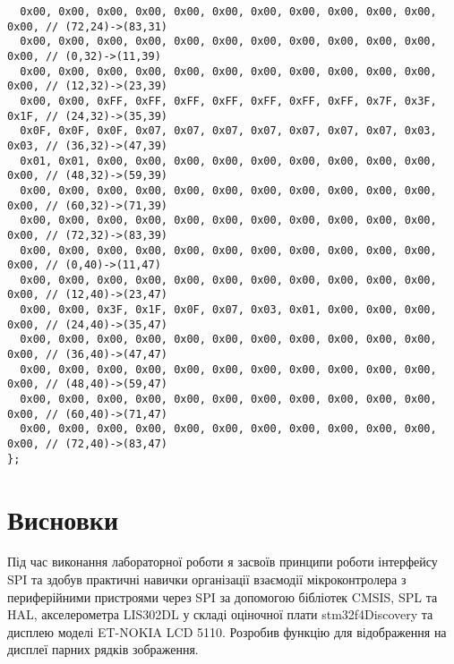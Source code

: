 \documentclass[oneside,14pt]{extarticle}
\begin{document}
\begin{normalsize}
{\begin{lstlisting}
  0x00, 0x00, 0x00, 0x00, 0x00, 0x00, 0x00, 0x00, 0x00, 0x00, 0x00, 0x00, // (72,24)->(83,31)
  0x00, 0x00, 0x00, 0x00, 0x00, 0x00, 0x00, 0x00, 0x00, 0x00, 0x00, 0x00, // (0,32)->(11,39)
  0x00, 0x00, 0x00, 0x00, 0x00, 0x00, 0x00, 0x00, 0x00, 0x00, 0x00, 0x00, // (12,32)->(23,39)
  0x00, 0x00, 0xFF, 0xFF, 0xFF, 0xFF, 0xFF, 0xFF, 0xFF, 0x7F, 0x3F, 0x1F, // (24,32)->(35,39)
  0x0F, 0x0F, 0x0F, 0x07, 0x07, 0x07, 0x07, 0x07, 0x07, 0x07, 0x03, 0x03, // (36,32)->(47,39)
  0x01, 0x01, 0x00, 0x00, 0x00, 0x00, 0x00, 0x00, 0x00, 0x00, 0x00, 0x00, // (48,32)->(59,39)
  0x00, 0x00, 0x00, 0x00, 0x00, 0x00, 0x00, 0x00, 0x00, 0x00, 0x00, 0x00, // (60,32)->(71,39)
  0x00, 0x00, 0x00, 0x00, 0x00, 0x00, 0x00, 0x00, 0x00, 0x00, 0x00, 0x00, // (72,32)->(83,39)
  0x00, 0x00, 0x00, 0x00, 0x00, 0x00, 0x00, 0x00, 0x00, 0x00, 0x00, 0x00, // (0,40)->(11,47)
  0x00, 0x00, 0x00, 0x00, 0x00, 0x00, 0x00, 0x00, 0x00, 0x00, 0x00, 0x00, // (12,40)->(23,47)
  0x00, 0x00, 0x3F, 0x1F, 0x0F, 0x07, 0x03, 0x01, 0x00, 0x00, 0x00, 0x00, // (24,40)->(35,47)
  0x00, 0x00, 0x00, 0x00, 0x00, 0x00, 0x00, 0x00, 0x00, 0x00, 0x00, 0x00, // (36,40)->(47,47)
  0x00, 0x00, 0x00, 0x00, 0x00, 0x00, 0x00, 0x00, 0x00, 0x00, 0x00, 0x00, // (48,40)->(59,47)
  0x00, 0x00, 0x00, 0x00, 0x00, 0x00, 0x00, 0x00, 0x00, 0x00, 0x00, 0x00, // (60,40)->(71,47)
  0x00, 0x00, 0x00, 0x00, 0x00, 0x00, 0x00, 0x00, 0x00, 0x00, 0x00, 0x00, // (72,40)->(83,47)
};
		\end{lstlisting}
	}
	
	\section*{Висновки}
	Під час виконання лабораторної роботи я засвоїв принципи роботи інтерфейсу SPI та здобув практичні навички організації взаємодії мікроконтролера з периферійними пристроями через SPI за допомогою бібліотек CMSIS, SPL та HAL, акселерометра LIS302DL у складі оціночної плати stm32f4Discovery та дисплею моделі ET-NOKIA LCD 5110. Розробив функцію для відображення на дисплеї парних рядків зображення.
	    
\end{normalsize}
\end{document}
